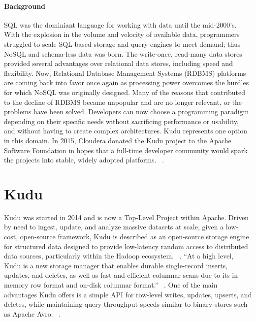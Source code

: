 \paragraph{Background} SQL was the dominiant language for working with data until the mid-2000's. With the explosion in the volume and velocity of available data, programmers struggled to scale SQL-based storage and query engines to meet demand; thus NoSQL and schema-less data was born. The write-once, read-many data stores provided several advantages over relational data stores, including speed and flexibility. Now, Relational Database Management Systems (RDBMS) platforms are coming back into favor once again as processing power overcomes the hurdles for which NoSQL was originally designed. Many of the reasons that contributed to the decline of RDBMS became unpopular and are no longer relevant, or the problems have been solved. Developers can now choose a programming paradigm depending on their specific needs without sacrificing performance or usability, and without having to create complex architectures.  Kudu represents one option in this domain. In 2015, Cloudera donated the Kudu project to the Apache Software Foundation in hopes that a full-time developer community would spark the projects into stable, widely adopted platforms. ~\cite{hid-sp18-407-cloudera-donates}.
\section{Kudu} Kudu was started in 2014 and is now a Top-Level Project within Apache. Driven by need to ingest, update, and analyze massive datasets at scale, given a low-cost, open-source framework, Kudu is described as an open-source storage engine for structured data designed to provide low-latency random access to distributed data sources, particularly within the Hadoop ecosystem. ~\cite{hid-sp18-407-kudu-intro}. ``At a high level, Kudu is a new storage manager that enables durable single-record inserts, updates, and deletes, as well as fast and efficient columnar scans due to its in-memory row format and on-disk columnar format.'' ~\cite{hid-sp18-407-kudu-impala-integration}. One of the main advantages Kudu offers is a simple API for row-level writes, updates, upserts, and deletes, while maintaining query throughput speeds similar to binary stores such as Apache Avro. ~\cite{hid-sp18-407-kudu-intro}.

